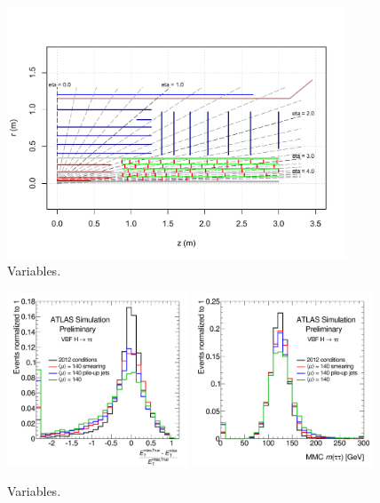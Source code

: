 \begin{figure}[tp]
  \centering
  \includegraphics[width=0.90\textwidth]{figures/PLOT-UPGRADE-2014-001/fig_08}
  \caption{Variables.}
  \label{fig:prospects-hllhc-layout}
\end{figure}

\begin{figure}[tp]
  \centering
  \includegraphics[width=0.48\textwidth]{figures/ATL-PHYS-PUB-2014-018/fig_01a}
  \includegraphics[width=0.48\textwidth]{figures/ATL-PHYS-PUB-2014-018/fig_01b}
  \caption{Variables.}
  \label{fig:prospects-hllhc-degradation}
\end{figure}

